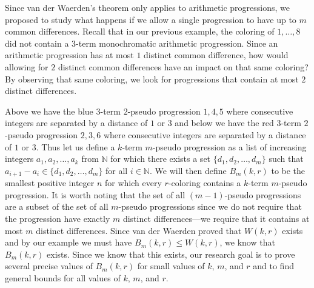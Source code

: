 \documentclass[ fontsize=10pt,twoside]{scrartcl}
\begin{document}
Since van der Waerden's theorem only applies to arithmetic progressions, we proposed to study what happens if we allow a single progression to have up to $m$ common differences. Recall that in our previous example, the coloring of $1,\ldots,8$ did not contain a $3$-term monochromatic arithmetic progression. Since an arithmetic progression has at most $1$ distinct common difference, how would allowing for $2$ distinct common differences have an impact on that same coloring? By observing that same coloring, we look for progressions that contain at most $2$ distinct differences.
\begin{center}
\end{center}

Above we have the blue $3$-term $2$-pseudo progression $1,4,5$ where  consecutive integers are separated by a distance of $1$ or $3$ and below we have the red $3$-term $2$-pseudo progression $2,3,6$ where consecutive integers are separated by a distance of $1$ or $3$. Thus let us define a $k$-term $m$-pseudo progression as a list of increasing integers $a_1,a_2,\ldots,a_k$ from $\mathbb{N}$ for which there exists a set $\{d_1,d_2,\ldots,d_{m}\}$ such that $a_{i+1} - a_i \in \{d_1,d_2,\ldots,d_{m}\}$ for all $i \in \mathbb{N}$. We will then define $B_m(k,r)$ to be the smallest positive integer $n$ for which every $r$-coloring contains a $k$-term $m$-pseudo progression. It is worth noting that the set of all $(m-1)$-pseudo progressions are a subset of the set of all $m$-pseudo progressions since we do not require that the progression have exactly $m$ distinct differences---we require that it contains at most $m$ distinct differences. Since van der Waerden proved that $W(k,r)$ exists and by our example we must have $B_m(k,r) \leq W(k,r)$, we know that $B_m(k,r)$ exists. Since we know that this exists, our research goal is to prove several precise values of $B_m(k,r)$ for small values of $k$, $m$, and $r$ and to find general bounds for all values of $k$, $m$, and $r.$
\end{document}
